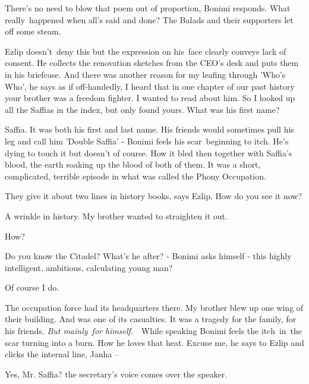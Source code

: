 \documentclass[letterpaper]{article}
\begin{document}
{\textquotedbl}There's no need to blow that poem out of proportion,{\textquotedbl} Bonimi responds. {\textquotedbl}What
really~happened when all's said and done? The Balads and their supporters let off some steam.{\textquotedbl} 

Ezlip doesn't~deny this but the expression on his~face clearly conveys lack of consent. He collects the renovation
sketches from the CEO's desk and puts them in his briefcase. {\textquotedbl}And there was another reason for my leafing
through {}'Who's Who{}',{\textquotedbl} he says as if off-handedly, {\textquotedbl}I heard that in one chapter of our
past history your brother was a freedom fighter. I wanted to read about him. So I looked up all the Saffias in the
index, but only found yours. What was his first name?{\textquotedbl}~

{\textquotedbl}Saffia. It was both his first and last name. His friends would sometimes pull his leg and call him
'Double Saffia' -{\textquotedbl} Bonimi feels his scar~beginning to itch. He's dying to touch it but doesn't of course.
How it bled then together with Saffia's blood, the earth soaking up the blood of both of them. {\textquotedbl}It was a
short, complicated, terrible episode in what was called the Phony Occupation.{\textquotedbl}

{\textquotedbl}They give it about two lines in history books,{\textquotedbl} says Ezlip. {\textquotedbl}How do you see
it now?{\textquotedbl} 

{\textquotedbl}A wrinkle in history. My brother wanted to straighten it out.{\textquotedbl} 

{\textquotedbl}How?{\textquotedbl} 

{\textquotedbl}Do you know the Citadel?{\textquotedbl} What's he after? - Bonimi asks himself - this highly intelligent,
ambitious, calculating young man? 

{\textquotedbl}Of course I do.{\textquotedbl} 

{\textquotedbl}The occupation force had its headquarters there. My brother blew up one wing of their building. And was
one of its casualties. It was a tragedy for the family, for his friends. \textit{But mainly}\ \textit{for
himself}.{\textquotedbl}\ \ While speaking Bonimi feels the itch\ in\ the scar turning into a burn. How he loves that
heat. {\textquotedbl}Excuse me,{\textquotedbl} he says to Ezlip and clicks the internal line, {\textquotedbl}Janha --
{\textquotedbl}

{\textquotedbl}Yes, Mr. Saffia?{\textquotedbl} the secretary's voice comes over the speaker.
\end{document}
